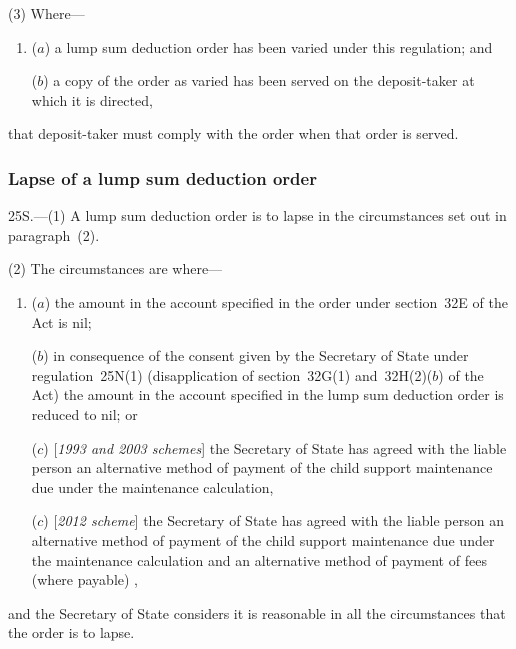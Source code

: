 \documentclass[12pt,a4paper]{article}
\begin{document}
(3) Where—
\begin{enumerate}\item[]
($a$) a lump sum deduction order has been varied under this regulation; and

($b$) a copy of the order as varied has been served on the deposit-taker at which it is directed,
\end{enumerate}
that deposit-taker must comply with the order when that order is served.


\subsubsection[25S. Lapse of a lump sum deduction order]{Lapse of a lump sum deduction order}

25S.---(1)  A lump sum deduction order is to lapse in the circumstances set out in paragraph~(2).

(2) The circumstances are where—
\begin{enumerate}\item[]
($a$) the amount in the account specified in the order under section~32E of the Act is nil;

($b$) in consequence of the consent given by the 
Secretary of State  %
under regulation~25N(1) (disapplication of section~32G(1) and~32H(2)($b$)  of the Act) the amount in the account specified in the lump sum deduction order is reduced to nil; or

($c$) [\emph{1993 and 2003 schemes}] the 
Secretary of State  %
has agreed with the liable person an alternative method of payment of the child support maintenance due under the maintenance calculation,

($c$) [\emph{2012 scheme}] the 
Secretary of State  %
has agreed with the liable person an alternative method of payment of the child support maintenance due under the maintenance calculation
and an alternative method of payment of fees (where payable)%
,
\end{enumerate}
and the 
Secretary of State  %
considers it is reasonable in all the circumstances that the order is to lapse.
\end{document}
